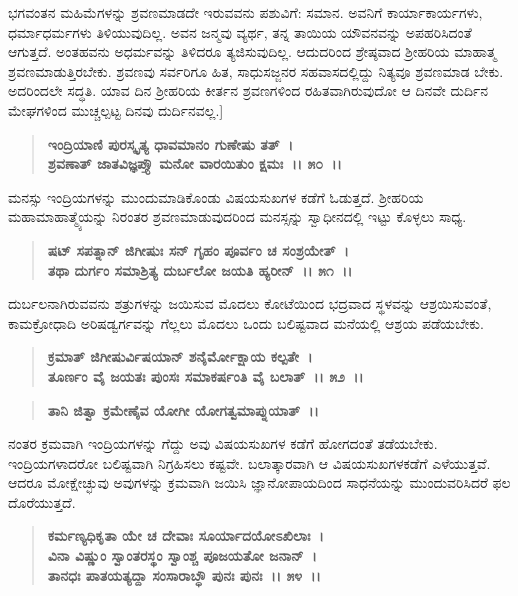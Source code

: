 ಭಗವಂತನ ಮಹಿಮೆಗಳನ್ನು ಶ್ರವಣಮಾಡದೇ ಇರುವವನು ಪಶುವಿಗೆ: ಸಮಾನ. ಅವನಿಗೆ ಕಾರ್ಯಾಕಾರ್ಯಗಳು, ಧರ್ಮಾಧರ್ಮಗಳು ತಿಳಿಯುವುದಿಲ್ಲ. ಅವನ ಜನ್ಮವು ವ್ಯರ್ಥ, ತನ್ನ ತಾಯಿಯ ಯೌವನವನ್ನು ಅಪಹರಿಸಿದಂತೆ ಆಗುತ್ತದೆ. ಅಂತಹವನು ಅಧರ್ಮವನ್ನು ತಿಳಿದರೂ ತ್ಯಜಿಸುವುದಿಲ್ಲ. ಆದುದರಿಂದ ಶ್ರೇಷ್ಠವಾದ ಶ‍್ರೀಹರಿಯ ಮಾಹಾತ್ಮ ಶ್ರವಣಮಾಡುತ್ತಿರಬೇಕು. ಶ್ರವಣವು ಸರ್ವರಿಗೂ ಹಿತ, ಸಾಧುಸಜ್ಜನರ ಸಹವಾಸದಲ್ಲಿದ್ದು ನಿತ್ಯವೂ ಶ್ರವಣಮಾಡ ಬೇಕು. ಅದರಿಂದಲೇ ಸದ್ಧತಿ. ಯಾವ ದಿನ ಶ‍್ರೀಹರಿಯ ಕೀರ್ತನ ಶ್ರವಣಗಳಿಂದ ರಹಿತವಾಗಿರುವುದೋ ಆ ದಿನವೇ ದುರ್ದಿನ ಮೇಘಗಳಿಂದ ಮುಚ್ಚಲ್ಪಟ್ಟ ದಿನವು ದುರ್ದಿನವಲ್ಲ.]

\begin{verse}
\textbf{ಇಂದ್ರಿಯಾಣಿ ಪುರಸ್ಕೃತ್ಯ ಧಾವಮಾನಂ ಗುಣೇಷು ತತ್~।}\\\textbf{ಶ್ರವಣಾತ್ ಜಾತವಿಜ್ಞಪ್ತ್ಯೌ ಮನೋ ವಾರಯಿತುಂ ಕ್ಷಮಃ~।। ೫೦~।।}
\end{verse}

ಮನಸ್ಸು ಇಂದ್ರಿಯಗಳನ್ನು ಮುಂದುಮಾಡಿಕೊಂಡು ವಿಷಯಸುಖಗಳ ಕಡೆಗೆ ಓಡುತ್ತದೆ. ಶ‍್ರೀಹರಿಯ ಮಹಾಮಾಹಾತ್ಮ್ಯೆಯನ್ನು ನಿರಂತರ ಶ್ರವಣಮಾಡುವುದರಿಂದ ಮನಸ್ಸನ್ನು ಸ್ವಾಧೀನದಲ್ಲಿ ಇಟ್ಟು ಕೊಳ್ಳಲು ಸಾಧ್ಯ.

\begin{verse}
\textbf{ಷಟ್ ಸಪತ್ನಾನ್ ಜಿಗೀಷುಃ ಸನ್ ಗೃಹಂ ಪೂರ್ವಂ ಚ ಸಂಶ್ರಯೇತ್~।}\\\textbf{ತಥಾ ದುರ್ಗಂ ಸಮಾಶ್ರಿತ್ಯ ದುರ್ಬಲೋ ಜಯತಿ ಹ್ಯರೀನ್~।। ೫೧~।।}
\end{verse}

ದುರ್ಬಲನಾಗಿರುವವನು ಶತ್ರುಗಳನ್ನು ಜಯಿಸುವ ಮೊದಲು ಕೋಟೆಯಿಂದ ಭದ್ರವಾದ ಸ್ಥಳವನ್ನು ಆಶ್ರಯಿಸುವಂತೆ, ಕಾಮಕ್ರೋಧಾದಿ ಅರಿಷಡ್ವರ್ಗವನ್ನು ಗೆಲ್ಲಲು ಮೊದಲು ಒಂದು ಬಲಿಷ್ಟವಾದ ಮನೆಯಲ್ಲಿ ಆಶ್ರಯ ಪಡೆಯಬೇಕು.

\begin{verse}
\textbf{ಕ್ರಮಾತ್ ಜಿಗೀಷುರ್ವಿಷಯಾನ್ ಶನೈರ್ಮೋಕ್ಷಾಯ ಕಲ್ಪತೇ~।}\\\textbf{ತೂರ್ಣಂ ವೈ ಜಯತಃ ಪುಂಸಃ ಸಮಾಕರ್ಷಂತಿ ವೈ ಬಲಾತ್~।। ೫೨~।।} 
\end{verse}

\begin{verse}
\textbf{ತಾನಿ ಜಿತ್ವಾ ಕ್ರಮೇಣೈವ ಯೋಗೀ ಯೋಗತ್ವಮಾಪ್ನುಯಾತ್~।।}
\end{verse}

ನಂತರ ಕ್ರಮವಾಗಿ ಇಂದ್ರಿಯಗಳನ್ನು ಗೆದ್ದು ಅವು ವಿಷಯಸುಖಗಳ ಕಡೆಗೆ ಹೋಗದಂತೆ ತಡೆಯಬೇಕು. ಇಂದ್ರಿಯಗಳಾದರೋ ಬಲಿಷ್ಟವಾಗಿ ನಿಗ್ರಹಿಸಲು ಕಷ್ಟವೇ. ಬಲಾತ್ಕಾರವಾಗಿ ಆ ವಿಷಯಸುಖಗಳಕಡೆಗೆ ಎಳೆಯುತ್ತವೆ. ಆದರೂ ಮೋಕ್ಷೇಚ್ಛುವು ಅವುಗಳನ್ನು ಕ್ರಮವಾಗಿ ಜಯಿಸಿ ಜ್ಞಾನೋಪಾಯದಿಂದ ಸಾಧನೆಯನ್ನು ಮುಂದುವರಿಸಿದರೆ ಫಲ ದೊರೆಯುತ್ತದೆ.

\begin{verse}
\textbf{ಕರ್ಮಣ್ಯಧಿಕೃತಾ ಯೇ ಚ ದೇವಾಃ ಸೂರ್ಯಾದಯೋಽಖಿಲಾಃ~।}\\\textbf{ವಿನಾ ವಿಷ್ಣುಂ ಸ್ವಾಂತರಸ್ಥಂ ಸ್ವಾಂಶ್ಚ ಪೂಜಯತೋ ಜನಾನ್~। }\\\textbf{ತಾನಧಃ ಪಾತಯತ್ಯದ್ದಾ ಸಂಸಾರಾಬ್ಧೌ ಪುನಃ ಪುನಃ~।। ೫೪~।।}
\end{verse}

